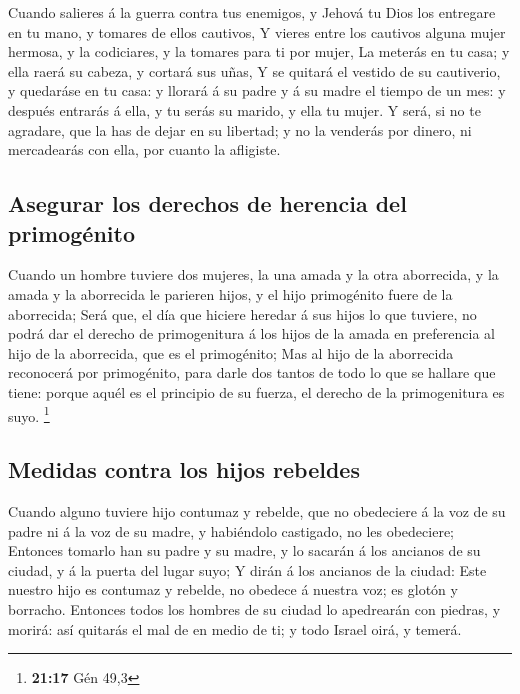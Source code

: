  Cuando salieres á la guerra contra tus enemigos, y
Jehová tu Dios los entregare en tu mano, y tomares de ellos cautivos,
 Y vieres entre los cautivos alguna mujer hermosa, y la
codiciares, y la tomares para ti por mujer,  La meterás
en tu casa; y ella raerá su cabeza, y cortará sus uñas, 
Y se quitará el vestido de su cautiverio, y quedaráse en tu casa: y
llorará á su padre y á su madre el tiempo de un mes: y después entrarás
á ella, y tu serás su marido, y ella tu mujer.  Y será,
si no te agradare, que la has de dejar en su libertad; y no la venderás
por dinero, ni mercadearás con ella, por cuanto la afligiste.

\hypertarget{asegurar-los-derechos-de-herencia-del-primoguxe9nito}{%
\subsection{Asegurar los derechos de herencia del
primogénito}\label{asegurar-los-derechos-de-herencia-del-primoguxe9nito}}

 Cuando un hombre tuviere dos mujeres, la una amada y la
otra aborrecida, y la amada y la aborrecida le parieren hijos, y el hijo
primogénito fuere de la aborrecida;  Será que, el día que
hiciere heredar á sus hijos lo que tuviere, no podrá dar el derecho de
primogenitura á los hijos de la amada en preferencia al hijo de la
aborrecida, que es el primogénito;  Mas al hijo de la
aborrecida reconocerá por primogénito, para darle dos tantos de todo lo
que se hallare que tiene: porque aquél es el principio de su fuerza, el
derecho de la primogenitura es suyo. \footnote{\textbf{21:17} Gén 49,3}

\hypertarget{medidas-contra-los-hijos-rebeldes}{%
\subsection{Medidas contra los hijos
rebeldes}\label{medidas-contra-los-hijos-rebeldes}}

 Cuando alguno tuviere hijo contumaz y rebelde, que no
obedeciere á la voz de su padre ni á la voz de su madre, y habiéndolo
castigado, no les obedeciere;  Entonces tomarlo han su
padre y su madre, y lo sacarán á los ancianos de su ciudad, y á la
puerta del lugar suyo;  Y dirán á los ancianos de la
ciudad: Este nuestro hijo es contumaz y rebelde, no obedece á nuestra
voz; es glotón y borracho.  Entonces todos los hombres de
su ciudad lo apedrearán con piedras, y morirá: así quitarás el mal de en
medio de ti; y todo Israel oirá, y temerá.

